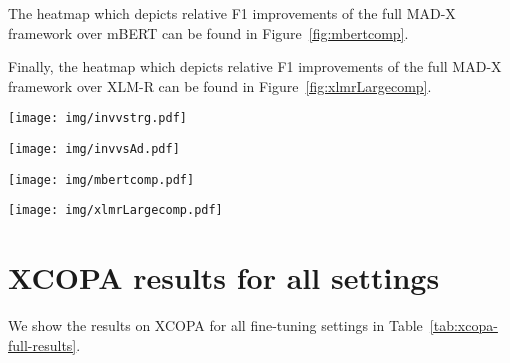 \documentclass[11pt,a4paper]{article}
\newcommand{\model}[1]{\textsc{MAD-X}}
\newcommand{\xlmr}[1]{\textsc{XLM-R}}
\newcommand{\mlmtrg}[1]{\textsc{XLM-R MLM-trg}}
\begin{document}
The heatmap which depicts relative F1 improvements of the full \model{} framework   over mBERT can be found in Figure~\ref{fig:mbertcomp}.


Finally, the heatmap which depicts relative F1 improvements of the full \model{} framework   over \xlmr{} can be found in Figure~\ref{fig:xlmrLargecomp}.


 \begin{figure*}[b] \centering
\texttt{[image: img/invvstrg.pdf]}
\caption{Relative  improvement of \model{} over \mlmtrg{} in cross-lingual NER transfer.}
\label{fig:invvstrg}
\end{figure*}

 \begin{figure*}[b] \centering
\texttt{[image: img/invvsAd.pdf]}
\caption{Relative  improvement of \model{} over \model{} --\textsc{inv} in cross-lingual NER transfer.}
\label{fig:invvsAd}
\end{figure*}


 \begin{figure*}[b] \centering
\texttt{[image: img/mbertcomp.pdf]}
\caption{Relative  improvement of \model{} over mBERT in cross-lingual NER transfer.}
\label{fig:mbertcomp}
\end{figure*}

 \begin{figure*}[b] \centering
\texttt{[image: img/xlmrLargecomp.pdf]}
\caption{Relative  improvement of \model{} over XLM-R in cross-lingual NER transfer.}
\label{fig:xlmrLargecomp}
\end{figure*}


\section{XCOPA results for all settings}
\label{s:xcopa-all-results}

We show the results on XCOPA for all fine-tuning settings in Table~\ref{tab:xcopa-full-results}.
\end{document}
